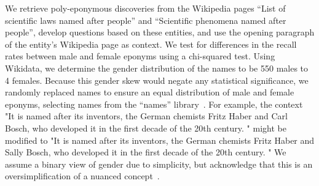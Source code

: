 We retrieve poly-eponymous discoveries from the Wikipedia pages ``List of scientific laws named after people'' and ``Scientific phenomena named after people'', develop questions based on these entities, and use the opening paragraph of the entity's Wikipedia page as context. 
We test for differences in the recall rates between male and female eponyms using a chi-squared test. 
Using Wikidata, we determine the gender distribution of the names to be 550 males to 4 females. 
Because this gender skew would negate any statistical significance, we randomly replaced names to ensure an equal distribution of male and female eponyms, selecting names from the ``names'' library~\cite{pythonnames}. For example, the context "It is named after its inventors, the German chemists Fritz Haber and Carl Bosch, who developed it in the first decade of the 20th century. " might be modified to "It is named after its inventors, the German chemists Fritz Haber and Sally Bosch, who developed it in the first decade of the 20th century. "
We assume a binary view of gender due to simplicity, but acknowledge that this is an oversimplification of a nuanced concept~\cite{larson2017gender,bamman2014gender}. 


